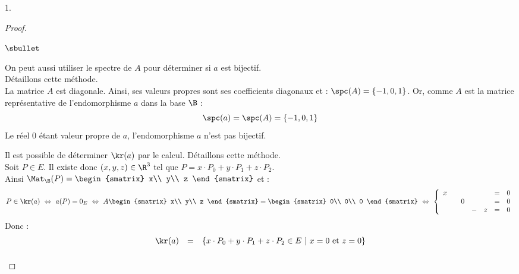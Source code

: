\begin{noliste}{1.}
\begin{proof}
    \begin{remark}
      \begin{noliste}{$\sbullet$}
      \item On peut aussi utiliser le spectre de $A$ pour déterminer
        si $a$ est bijectif.\\
        Détaillons cette méthode.\\[.2cm]
        La matrice $A$ est diagonale. Ainsi, ses valeurs propres sont
        ses coefficients diagonaux et : $\spc(A) = \{-1,0,1\}$. Or,
        comme $A$ est la matrice représentative de l'endomorphisme $a$
        dans la base $\B$ :
        \[
        \spc(a) = \spc(A) = \{-1,0,1\}
        \]
        Le réel $0$ étant valeur propre de $a$, l'endomorphisme $a$ n'est
        pas bijectif.
      \item Il est possible de déterminer $\kr(a)$ par le
        calcul. Détaillons cette méthode.\\[.2cm]
        Soit $P \in E$. Il existe donc $(x, y, z) \in \R^3$ tel que $P
        = x \cdot P_0 + y \cdot P_1 + z \cdot P_2$.\\
        Ainsi $\Mat_{\B}(P) =
        \begin{smatrix}
          x\\ 
          y\\ 
          z
	\end{smatrix}$ et :
	\[
	P\in\kr(a) \ \Leftrightarrow \ a(P) = 0_{E} \ \Leftrightarrow
        \ A
	\begin{smatrix}
          x\\ 
          y\\ 
          z
	\end{smatrix}
	= 
	\begin{smatrix}
          0\\ 
          0\\ 
          0
	\end{smatrix} 
	\
	\Leftrightarrow
	\
	\left\{ 
          \begin{array}{rrrrrcl}
            x & & & & & = & 0\\
            & & 0 & & & = & 0\\
            & & & - & z & = & 0
          \end{array}
	\right.
	\]
	Donc :
	\[
	\begin{array}{rcl}
          \kr(a) & = & \left\{ 
            x \cdot P_0 + y \cdot P_1 + z \cdot P_2 \in E \ \vert \
            x=0
            \mbox{ et }
            z=0
          \right\}
          \\[.2cm]

\end{array}\]
\end{noliste}
\end{remark}
\end{proof}
\end{noliste}
